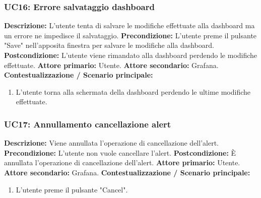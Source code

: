                     \subsubsection{UC16: Errore salvataggio dashboard}
                    \textbf{Descrizione:} L'utente tenta di salvare le modifiche effettuate alla dashboard ma un errore ne impedisce il salvataggio.
                    \newline
                    \textbf{Precondizione:} L'utente preme il pulsante "Save" nell'apposita finestra per salvare le modifiche alla dashboard.
                    \newline
                    \textbf{Postcondizione:} L'utente viene rimandato alla dashboard perdendo le modifiche effettuate.
                    \newline
                    \textbf{Attore primario:} Utente.
                    \newline
                    \textbf{Attore secondario:} Grafana.
                    \newline
                    \textbf{Contestualizzazione / Scenario principale:} \begin{enumerate}
                            \item L'utente torna alla schermata della dashboard perdendo le ultime modifiche effettuate.
                        \end{enumerate}
                        
                    \subsubsection{UC17: Annullamento cancellazione alert}
                    \textbf{Descrizione:} Viene annullata l'operazione di cancellazione dell'alert.
                    \newline
                    \textbf{Precondizione:} L'utente non vuole cancellare l'alert.
                    \newline
                    \textbf{Postcondizione:} È annullata l'operazione di cancellazione dell'alert.
                    \newline
                    \textbf{Attore primario:} Utente.
                    \newline
                    \textbf{Attore secondario:} Grafana.
                    \newline
                    \textbf{Contestualizzazione / Scenario principale:} \begin{enumerate}
                            \item L'utente preme il pulsante "Cancel".
                            
                        \end{enumerate}
\newpage

